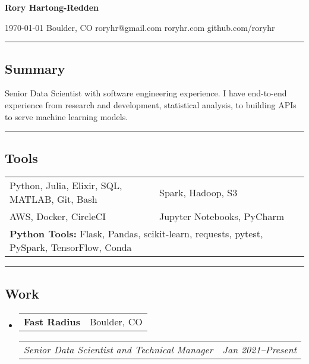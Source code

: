 \documentclass[10pt,letterpaper]{article}
\makeatletter
\newenvironment{indentsection}[1]
{\begin{list}{}%
	{\setlength{\leftmargin}{#1}}
	\item[]%
}
{\end{list}}
\newcommand{\headerrow}[2]{
\begin{tabular*}{\linewidth}{l@{\extracolsep{\fill}}r}
		#1 &
		#2 \\
	\end{tabular*}
}
\newcommand{\jobitem}[4]{\item \headerrow{\textbf{#1}}{#2}
\headerrow{\emph{#3}}{\emph{#4}}}
\makeatother
\begin{document}
{\raggedright \LARGE \bf Rory Hartong-Redden}

{\raggedleft 
\today \/ \textbar
\/ Boulder, CO \textbar
\/ roryhr@gmail.com \textbar
\/ roryhr.com \textbar\/   
github.com/roryhr\\
}
\hrule

\subsection*{Summary}
\begin{centering}  
Senior Data Scientist with software engineering experience. I have end-to-end experience from research and development, statistical analysis, to building APIs to serve machine learning models.\\
\end{centering}
\hrule

\subsection*{Tools}
\begin{indentsection}{\parindent}
\begin{tabular}{p{0.5\linewidth}   p{0.5\linewidth}} 
	Python, Julia, Elixir, SQL, MATLAB, Git, Bash
	& Spark, Hadoop, S3 \\

	AWS, Docker, CircleCI 
	& Jupyter Notebooks, PyCharm\\ 
	
	\multicolumn{2}{l}{
		\textbf{Python Tools:} Flask, Pandas, scikit-learn, requests, pytest, PySpark, TensorFlow, Conda
		}
\end{tabular}
\end{indentsection}

\hrule
\subsection*{Work}

\begin{itemize}
	\jobitem{Fast Radius}{Boulder, CO}
		     {Senior Data Scientist and Technical Manager}{Jan 2021--Present}
\end{itemize}
\end{document}
